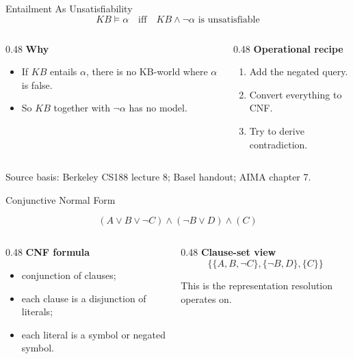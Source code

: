 \documentclass[aspectratio=169,11pt]{beamer}
\newcommand{\minihead}[1]{\textbf{\color{unswblue}#1}}
\newcommand{\source}[1]{\vfill{\scriptsize\color{darkgrey}Source basis: #1}}
\begin{document}
\begin{frame}{Entailment As Unsatisfiability}
  \[
    KB \models \alpha
    \quad \text{iff} \quad
    KB \land \neg \alpha \text{ is unsatisfiable}
  \]

  \begin{columns}[T,onlytextwidth]
    \begin{column}{0.48\textwidth}
      \minihead{Why}
      \begin{itemize}
        \item If $KB$ entails $\alpha$, there is no KB-world where $\alpha$ is false.
        \item So $KB$ together with $\neg \alpha$ has no model.
      \end{itemize}
    \end{column}
    \begin{column}{0.48\textwidth}
      \minihead{Operational recipe}
      \begin{enumerate}
        \item Add the negated query.
        \item Convert everything to CNF.
        \item Try to derive contradiction.
      \end{enumerate}
    \end{column}
  \end{columns}

  \source{Berkeley CS188 lecture 8; Basel handout; AIMA chapter 7.}
\end{frame}

\begin{frame}{Conjunctive Normal Form}
  \begin{center}
    \[
      (A \lor B \lor \neg C)
      \land
      (\neg B \lor D)
      \land
      (C)
    \]
  \end{center}

  \begin{columns}[T,onlytextwidth]
    \begin{column}{0.48\textwidth}
      \minihead{CNF formula}
      \begin{itemize}
        \item conjunction of clauses;
        \item each clause is a disjunction of literals;
        \item each literal is a symbol or negated symbol.
      \end{itemize}
    \end{column}
    \begin{column}{0.48\textwidth}
      \minihead{Clause-set view}
      \[
        \{\{A,B,\neg C\},\{\neg B,D\},\{C\}\}
      \]

      This is the representation resolution operates on.
    \end{column}
  \end{columns}
\end{frame}
\end{document}
